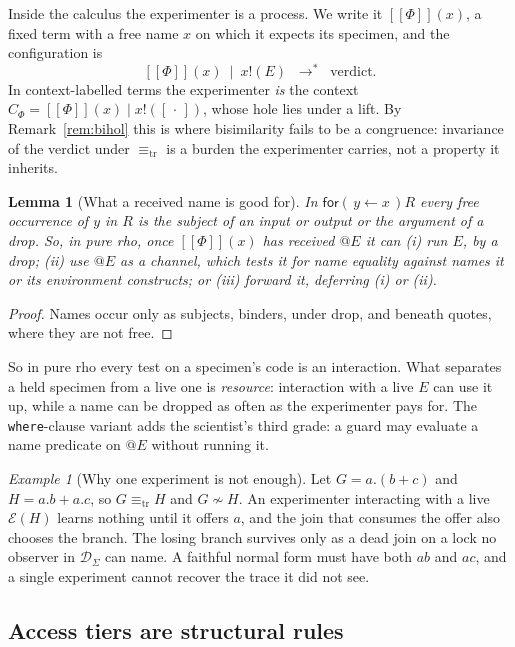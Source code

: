\documentclass[11pt]{article}
\makeatletter
\theoremstyle{definition}
\theoremstyle{plain}
\newtheorem{lemma}[definition]{Lemma}
\theoremstyle{remark}
\newtheorem{example}[definition]{Example}
\newcommand{\quo}[1]{@#1}
\newcommand{\inp}[3]{\mathsf{for}(\,#1 \leftarrow #2\,)#3}
\newcommand{\out}[2]{#1!(#2)}
\newcommand{\enc}[1]{[\![#1]\!]}
\newcommand{\Obs}{\mathcal{D}}
\newcommand{\sbisim}{\sim}
\newcommand{\treq}{\equiv_{\mathrm{tr}}}
\newcommand{\hole}{[\,\cdot\,]}
\makeatother
\begin{document}
Inside the calculus the experimenter is a process. We write it
$\enc{\Phi}(x)$, a fixed term with a free name $x$ on which it expects its
specimen, and the configuration is
\[
\enc{\Phi}(x) \ \mid\ \out{x}{E} \;\;\to^*\;\; \text{verdict}.
\]
In context-labelled terms the experimenter \emph{is} the context
$C_\Phi = \enc{\Phi}(x) \mid \out{x}{\hole}$, whose hole lies under a
lift. By Remark~\ref{rem:bihol} this is where bisimilarity fails to be a
congruence: invariance of the verdict under $\treq$ is a burden the
experimenter carries, not a property it inherits.

\begin{lemma}[What a received name is good for]\label{lem:uses}
In $\inp{y}{x}{R}$ every free occurrence of $y$ in $R$ is the subject of
an input or output or the argument of a drop. So, in pure rho, once
$\enc{\Phi}(x)$ has received $\quo{E}$ it can (i) run $E$, by a drop;
(ii) use $\quo{E}$ as a channel, which tests it for name equality against
names it or its environment constructs; or (iii) forward it, deferring
(i) or (ii).
\end{lemma}

\begin{proof}
Names occur only as subjects, binders, under drop, and beneath quotes,
where they are not free.
\end{proof}

So in pure rho every test on a specimen's code is an interaction. What
separates a held specimen from a live one is \emph{resource}: interaction
with a live $E$ can use it up, while a name can be dropped as often as the
experimenter pays for. The \texttt{where}-clause variant adds the
scientist's third grade: a guard may evaluate a name predicate on
$\quo{E}$ without running it.

\begin{example}[Why one experiment is not enough]\label{ex:linear}
Let $G = a.(b + c)$ and $H = a.b + a.c$, so $G \treq H$ and $G
\not\sbisim H$. An experimenter interacting with a live $\mathcal{E}(H)$
learns nothing until it offers $a$, and the join that consumes the offer
also chooses the branch. The losing branch survives only as a dead join on
a lock no observer in $\Obs_\Sigma$ can name. A faithful normal form must
have both $ab$ and $ac$, and a single experiment cannot recover the trace
it did not see.
\end{example}

\subsection{Access tiers are structural rules}\label{sec:tiers}
\end{document}
